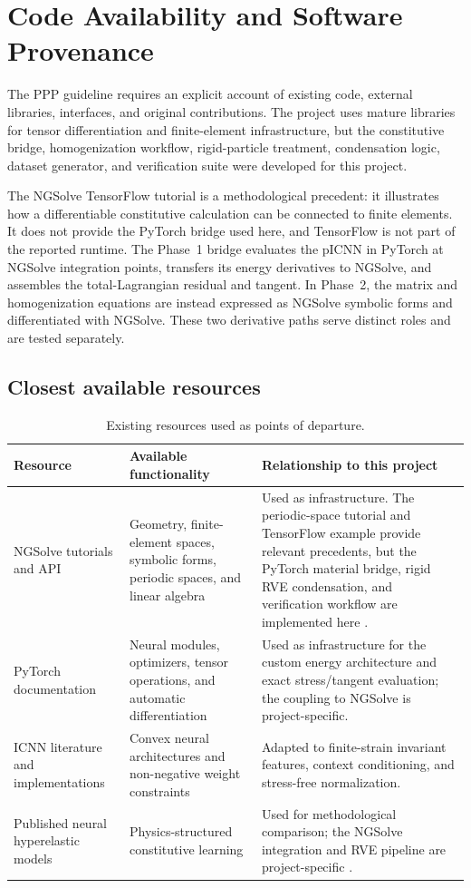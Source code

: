 \chapter{Code Availability and Software Provenance}
\label{ch:provenance}

The PPP guideline requires an explicit account of existing code, external
libraries, interfaces, and original contributions. The project uses mature
libraries for tensor differentiation and finite-element infrastructure, but
the constitutive bridge, homogenization workflow, rigid-particle treatment,
condensation logic, dataset generator, and verification suite were developed
for this project.

The NGSolve TensorFlow tutorial is a methodological precedent: it illustrates
how a differentiable constitutive calculation can be connected to finite
elements. It does not provide the PyTorch bridge used here, and TensorFlow is
not part of the reported runtime. The Phase~1 bridge evaluates the pICNN in
PyTorch at NGSolve integration points, transfers its energy derivatives to
NGSolve, and assembles the total-Lagrangian residual and tangent. In Phase~2,
the matrix and homogenization equations are instead expressed as NGSolve
symbolic forms and differentiated with NGSolve. These two derivative paths
serve distinct roles and are tested separately.

\section{Closest available resources}

\begin{table}[H]
\centering
\caption{Existing resources used as points of departure.}
\label{tab:available-code}
\begin{tabularx}{\textwidth}{@{}p{}X X@{}}
\toprule
Resource & Available functionality & Relationship to this project\\
\midrule
NGSolve tutorials and API
& Geometry, finite-element spaces, symbolic forms, periodic spaces, and
linear algebra
& Used as infrastructure. The periodic-space tutorial and TensorFlow example
provide relevant precedents, but the PyTorch material bridge, rigid RVE
condensation, and verification workflow are implemented here
\cite{ngsolve_periodic,ngsolve_tensorflow}.\\
PyTorch documentation
& Neural modules, optimizers, tensor operations, and automatic differentiation
& Used as infrastructure for the custom energy architecture and exact
stress/tangent evaluation; the coupling to NGSolve is project-specific.\\
ICNN literature and implementations
& Convex neural architectures and non-negative weight constraints
& Adapted to finite-strain invariant features, context conditioning, and
stress-free normalization.\\
Published neural hyperelastic models
& Physics-structured constitutive learning
& Used for methodological comparison; the NGSolve integration and RVE
pipeline are project-specific \cite{kalina2022,linden2023}.\\
\bottomrule
\end{tabularx}
\end{table}

